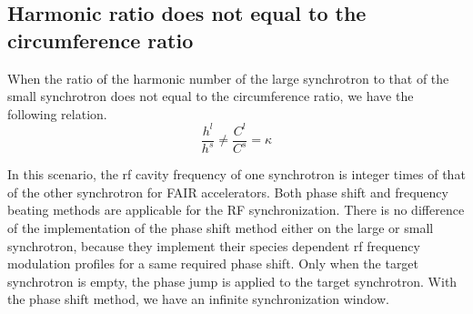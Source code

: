 \subsection{Harmonic ratio does not equal to the circumference ratio} 
\label{sec:cir_no_int1}
When the ratio of the harmonic number of the large synchrotron to that of the small synchrotron does not equal to the circumference ratio, we have the following relation.
\begin{equation}
\frac {h^{l}}{h^{s}}\neq \frac {C^{l}}{C^{s}}= \kappa  \label{harmonic_1_noint}
\end{equation}



In this scenario, the rf cavity frequency of one synchrotron is integer times of that of the other synchrotron for FAIR accelerators. Both phase shift and frequency beating methods are applicable for the RF synchronization. There is no difference of the implementation of the phase shift method either on the large or small synchrotron, because they implement their species dependent rf frequency modulation profiles for a same required phase shift. Only when the target synchrotron is empty, the phase jump is applied to the target synchrotron. With the phase shift method, we have an infinite synchronization window. 

